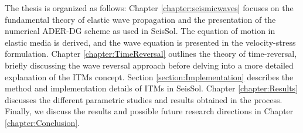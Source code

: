 The thesis is organized as follows: Chapter \ref{chapter:seismicwaves} focuses on the fundamental theory of elastic wave propagation and the presentation
of the numerical \ac{ADER}-\ac{DG} scheme as used in SeisSol. The equation of motion in elastic media is derived, and the wave equation is presented
in the velocity-stress formulation. Chapter \ref{chapter:TimeReversal} outlines the theory of time-reversal, briefly discussing the wave reversal approach before
delving into a more detailed explanation of the \ac{ITM}s concept. Section \ref{section:Implementation} describes the method and implementation details of \ac{ITM}s
in SeisSol. Chapter \ref{chapter:Results} discusses the different parametric studies and results obtained in the process. Finally, we discuss the results
and possible future research directions in Chapter \ref{chapter:Conclusion}. 

